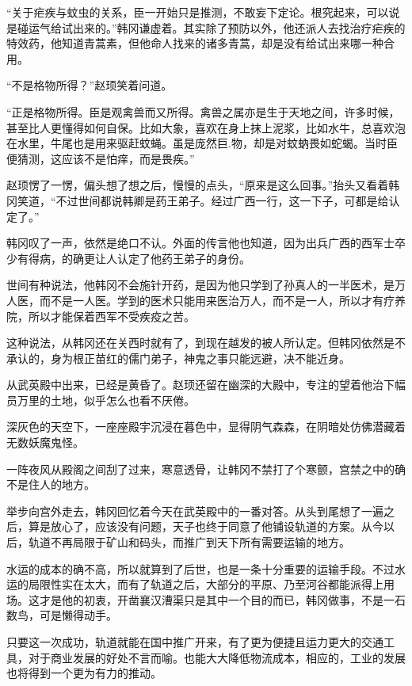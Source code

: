 “关于疟疾与蚊虫的关系，臣一开始只是推测，不敢妄下定论。根究起来，可以说是碰运气给试出来的。”韩冈谦虚着。其实除了预防以外，他还派人去找治疗疟疾的特效药，他知道青蒿素，但他命人找来的诸多青蒿，却是没有给试出来哪一种合用。

“不是格物所得？”赵顼笑着问道。

“正是格物所得。臣是观禽兽而又所得。禽兽之属亦是生于天地之间，许多时候，甚至比人更懂得如何自保。比如大象，喜欢在身上抹上泥浆，比如水牛，总喜欢泡在水里，牛尾也是用来驱赶蚊蝇。虽是庞然巨.物，却是对蚊蚋畏如蛇蝎。当时臣便猜测，这应该不是怕痒，而是畏疾。”

赵顼愣了一愣，偏头想了想之后，慢慢的点头，“原来是这么回事。”抬头又看着韩冈笑道，“不过世间都说韩卿是药王弟子。经过广西一行，这一下子，可都是给认定了。”

韩冈叹了一声，依然是绝口不认。外面的传言他也知道，因为出兵广西的西军士卒少有得病，的确更让人认定了他药王弟子的身份。

世间有种说法，他韩冈不会施针开药，是因为他只学到了孙真人的一半医术，是万人医，而不是一人医。学到的医术只能用来医治万人，而不是一人，所以才有疗养院，所以才能保着西军不受疾疫之苦。

这种说法，从韩冈还在关西时就有了，到现在越发的被人所认定。但韩冈依然是不承认的，身为根正苗红的儒门弟子，神鬼之事只能远避，决不能近身。

从武英殿中出来，已经是黄昏了。赵顼还留在幽深的大殿中，专注的望着他治下幅员万里的土地，似乎怎么也看不厌倦。

深灰色的天空下，一座座殿宇沉浸在暮色中，显得阴气森森，在阴暗处仿佛潜藏着无数妖魔鬼怪。

一阵夜风从殿阁之间刮了过来，寒意透骨，让韩冈不禁打了个寒颤，宫禁之中的确不是住人的地方。

举步向宫外走去，韩冈回忆着今天在武英殿中的一番对答。从头到尾想了一遍之后，算是放心了，应该没有问题，天子也终于同意了他铺设轨道的方案。从今以后，轨道不再局限于矿山和码头，而推广到天下所有需要运输的地方。

水运的成本的确不高，所以就算到了后世，也是一条十分重要的运输手段。不过水运的局限性实在太大，而有了轨道之后，大部分的平原、乃至河谷都能派得上用场。这才是他的初衷，开凿襄汉漕渠只是其中一个目的而已，韩冈做事，不是一石数鸟，可是懒得动手。

只要这一次成功，轨道就能在国中推广开来，有了更为便捷且运力更大的交通工具，对于商业发展的好处不言而喻。也能大大降低物流成本，相应的，工业的发展也将得到一个更为有力的推动。

